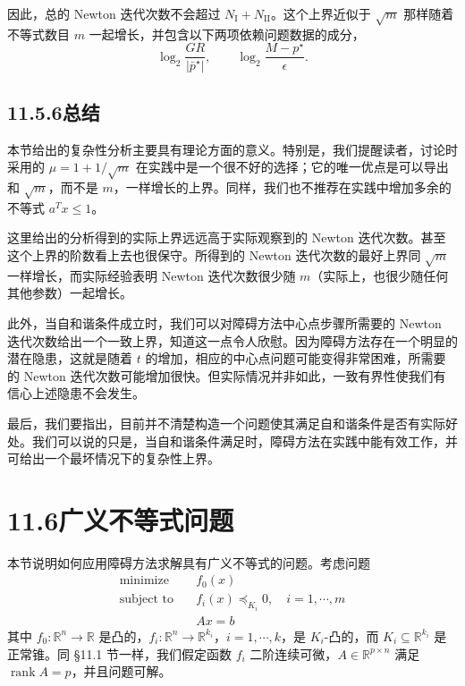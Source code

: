 \documentclass[UTF8,12pt,a4paper,fontset=fandol]{ctexart}
\begin{document}
因此，总的 Newton 迭代次数不会超过 $N_{\mathrm{I}}+N_{\mathrm{II}}$。这个上界近似于 $\sqrt{m}$ 那样随着不等式数目 $m$ 一起增长，并包含以下两项依赖问题数据的成分，
\[
\log_2\frac{GR}{|\bar{p}^\star|},\qquad \log_2\frac{M-p^\star}{\epsilon}.
\]

\subsection*{11.5.6\quad 总结}

本节给出的复杂性分析主要具有理论方面的意义。特别是，我们提醒读者，讨论时采用的 $\mu=1+1/\sqrt{m}$ 在实践中是一个很不好的选择；它的唯一优点是可以导出和 $\sqrt{m}$，而不是 $m$，一样增长的上界。同样，我们也不推荐在实践中增加多余的不等式 $a^Tx\leq 1$。

这里给出的分析得到的实际上界远远高于实际观察到的 Newton 迭代次数。甚至这个上界的阶数看上去也很保守。所得到的 Newton 迭代次数的最好上界同 $\sqrt{m}$ 一样增长，而实际经验表明 Newton 迭代次数很少随 $m$（实际上，也很少随任何其他参数）一起增长。

此外，当自和谐条件成立时，我们可以对障碍方法中心点步骤所需要的 Newton 迭代次数给出一个一致上界，知道这一点令人欣慰。因为障碍方法存在一个明显的潜在隐患，这就是随着 $t$ 的增加，相应的中心点问题可能变得非常困难，所需要的 Newton 迭代次数可能增加很快。但实际情况并非如此，一致有界性使我们有信心上述隐患不会发生。

最后，我们要指出，目前并不清楚构造一个问题使其满足自和谐条件是否有实际好处。我们可以说的只是，当自和谐条件满足时，障碍方法在实践中能有效工作，并可给出一个最坏情况下的复杂性上界。

\section*{11.6\quad 广义不等式问题}

本节说明如何应用障碍方法求解具有广义不等式的问题。考虑问题
\begin{equation}
\begin{aligned}
\text{minimize}\quad & f_0(x)\\
\text{subject to}\quad & f_i(x)\preceq_{K_i}0,\quad i=1,\cdots,m\\
& Ax=b
\end{aligned}
\tag{11.38}
\end{equation}
其中 $f_0:\mathbb{R}^n\to\mathbb{R}$ 是凸的，$f_i:\mathbb{R}^n\to\mathbb{R}^{k_i}$，$i=1,\cdots,k$，是 $K_i$-凸的，而 $K_i\subseteq\mathbb{R}^{k_i}$ 是正常锥。同 \S11.1 节一样，我们假定函数 $f_i$ 二阶连续可微，$A\in\mathbb{R}^{p\times n}$ 满足 $\operatorname{rank}A=p$，并且问题可解。
\end{document}
